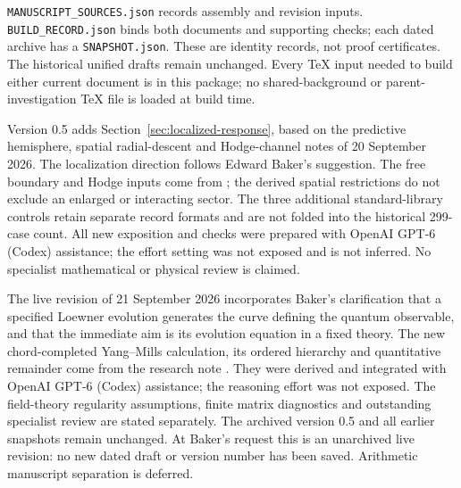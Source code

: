 \nolinkurl{MANUSCRIPT_SOURCES.json} records assembly and revision
inputs. \nolinkurl{BUILD_RECORD.json} binds both documents and
supporting checks; each dated archive has a
\nolinkurl{SNAPSHOT.json}. These are identity records, not proof
certificates. The historical unified drafts remain unchanged.
Every TeX input needed to build either current document is in this
package; no shared-background or parent-investigation TeX file is
loaded at build time.

Version 0.5 adds Section~\ref{sec:localized-response}, based on the
predictive hemisphere, spatial radial-descent and Hodge-channel
notes of 20 September 2026. The localization direction follows
Edward Baker's suggestion. The free boundary and Hodge inputs come
from \cite{DPYHiggs,DedushenkoGluing}; the derived spatial restrictions
do not exclude an enlarged or interacting sector. The three
additional standard-library controls retain separate record formats
and are not folded into the historical 299-case count.
All new exposition and checks were prepared with OpenAI GPT-6
(Codex) assistance; the effort setting was not exposed and is not
inferred. No specialist mathematical or physical review is claimed.


The live revision of 21 September 2026 incorporates Baker's clarification
that a specified Loewner evolution generates the curve defining the quantum
observable, and that the immediate aim is its evolution equation in a fixed
theory. The new chord-completed Yang--Mills calculation, its ordered hierarchy
and quantitative remainder come from the research note \cite{GrowingTraceNote}.
They were derived and integrated with OpenAI GPT-6 (Codex) assistance; the
reasoning effort was not exposed. The field-theory regularity assumptions,
finite matrix diagnostics and outstanding specialist review are stated
separately. The archived version 0.5 and all earlier snapshots remain unchanged.
At Baker's request this is an unarchived live revision: no new dated draft or
version number has been saved. Arithmetic manuscript separation is deferred.
